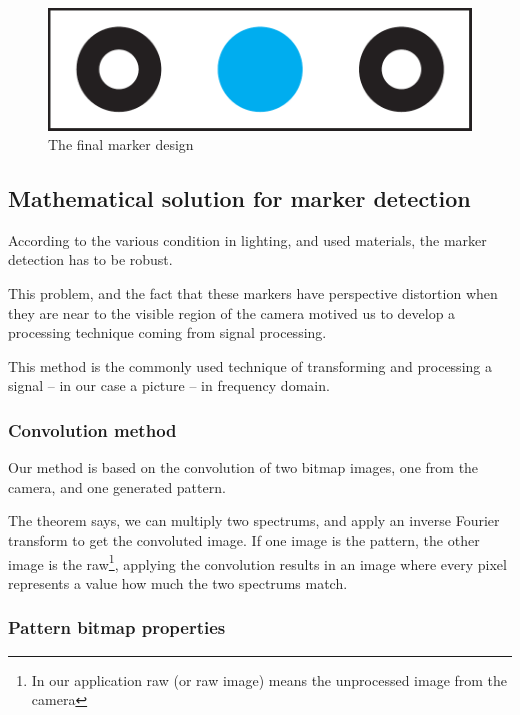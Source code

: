 \begin{figure}[h]
	\centering
	\includegraphics[width=0.5\linewidth]{include/figures/chapter_6/opencv_finalmarker}
	\caption{The final marker design}
	\label{fig:case_study:final_marker} 
\end{figure}

\subsection{Mathematical solution for marker detection}
\label{fig:case_study:opencv_math}


According to the various condition in lighting, and used materials, the marker detection has to be robust.

This problem, and the fact that these markers have perspective distortion when they are near to the visible region of the camera motived us to develop a processing technique coming from signal processing.

This method is the commonly used technique of transforming and processing a signal -- in our case a picture -- in frequency domain.

\subsubsection{Convolution method}
\label{sec:case_study:convolution}

Our method is based on the convolution of two bitmap images, one from the camera, and one generated pattern.

The theorem says, we can multiply two spectrums, and apply an inverse Fourier transform to get the convoluted image. If one image is the pattern, the other image is the raw\footnote{In our application raw (or raw image) means the unprocessed image from the camera}, applying the convolution results in an image where every pixel represents a value how much the two spectrums match.

\subsubsection{Pattern bitmap properties}

